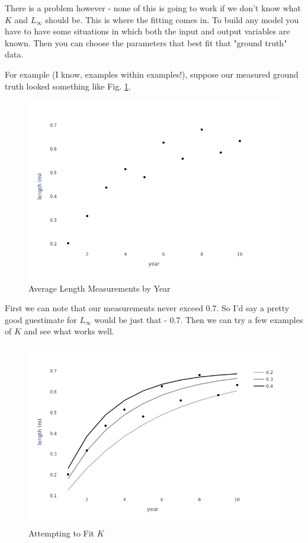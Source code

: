 \documentclass[11pt,a5paper]{book}
\begin{document}
There is a problem however - none of this is going to work if we don't know what $K$ and $L_{\infty}$ should be. This is where the fitting comes in. To build any model you have to have some situations in which both the input and output variables are known. Then you can choose the parameters that best fit that "ground truth" data. 
\newline

For example (I know, examples within examples!), suppose our measured ground truth looked something like Fig. \ref{fig:length_measurements_by_year}.
\newline


\begin{figure}[h!] 
  \includegraphics[scale=0.35]{notebooks/Fitting/new_measurements.png}
  \caption{Average Length Measurements by Year}
  \label{fig:length_measurements_by_year}
\end{figure}

First we can note that our measurements never exceed 0.7. So I'd say a pretty good guestimate for $L_{\infty}$ would be just that - 0.7.  Then we can try a few examples of $K$ and see what works well.
\newline

\begin{figure}[h!] 
  \includegraphics[width=\linewidth]{notebooks/Fitting/fit_lines.png}
  \caption{Attempting to Fit $K$}
  \label{fig:fitting_K}
\end{figure}
\end{document}
